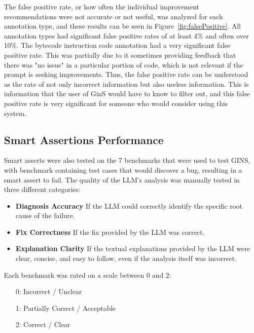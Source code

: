 \documentclass[sigconf]{acmart}
\begin{document}
The false positive rate, or how often the individual improvement recommendations were not accurate or not useful, was analyzed for each annotation type, and these results can be seen in Figure~\ref{fig:falsePositive}.
All annotation types had significant false positive rates of at least 4\% and often over 10\%.
The bytecode instruction code annotation had a very significant false positive rate.
This was partially due to it sometimes providing feedback that there was "no issue" in a particular portion of code, which is not relevant if the prompt is seeking improvements.
Thus, the false positive rate can be understood as the rate of not only incorrect information but also useless information.
This is information that the user of GinS would have to know to filter out, and this false positive rate is very significant for someone who would consider using this system.

\subsection{Smart Assertions Performance}
Smart asserts were also tested on the 7 benchmarks that were used to test GINS, with benchmark containing test cases that would discover a bug, resulting in a smart assert to fail.
The quality of the LLM's analysis was manually tested in three different categories:

\begin{itemize}
    \item \textbf{Diagnosis Accuracy} If the LLM could correctly identify the specific root cause of the failure.
    \item \textbf{Fix Correctness} If the fix provided by the LLM was correct.
    \item \textbf{Explanation Clarity} If the textual explanations provided by the LLM were clear, concise, and easy to follow, even if the analysis itself was incorrect.
\end{itemize}

Each benchmark was rated on a scale between 0 and 2:

\begin{itemize}
    \item[0:] Incorrect / Unclear 
    \item[1:] Partially Correct / Acceptable
    \item[2:] Correct / Clear
\end{itemize}
\end{document}
